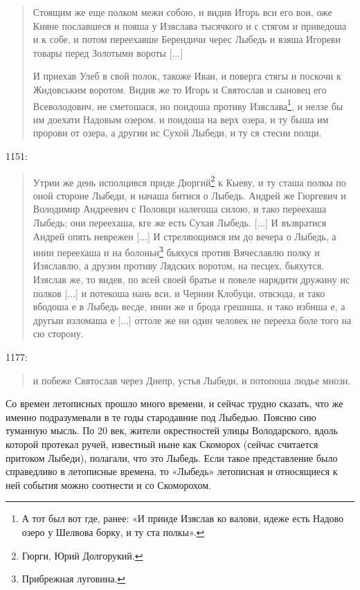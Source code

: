 \begin{quotation}
\noindent Стоящим же еще полком межи собою, и видив Игорь вси его вои, оже Кияне пославшеся и пояша у Изяслава тысячкого и с стягом и приведоша и к собе, и потом переехавше Берендичи черес Лыбедь и взяша Игореви товары перед Золотыми вороты [...]

И приехав Улеб в свой полок, такоже Иван, и поверга стягы и поскочи к Жидовським воротом. Видив же то Игорь и Святослав и сыновец его Всеволодович, не сметошася, но поидоша противу Изяслава\footnote{А тот был вот где, ранее: «И прииде Изяслав ко валови, идеже есть Надово озеро у Шелвова борку, и ту ста полкы».}, и нелзе бы им доехати Надовым озером, и поидоша на верх озера, и ту быша им пророви от озера, а другии ис Сухой Лыбеди, и ту ся стесни полци.
\end{quotation} 

1151:

\begin{quotation}
\noindent Утрии же день исполцився приде Дюргий\footnote{Гюрги, Юрий Долгорукий.} к Кыеву, и ту сташа полкы по оной стороне Лыбеди, и начаша битися о Лыбедь. Андрей же Гюргевич и Володимир Андреевич с Половци налегоша силою, и тако переехаша Лыбедь; они переехаша, кге же есть Сухая Лыбедь. [...]
И възвратися Андрей опять неврежен [...] И стреляющимся им до вечера о Лыбедь, а инии переехаша и на болоньи\footnote{Прибрежная луговина.} бьяхуся против Вячеславлю полку и Изяславлю, а друзии противу Лядских воротом, на песцех, бьяхутся. Изяслав же, то видев, по всей своей братье и повеле нарядити дружину ис полков [...] и потекоша нань вси, и Чернии Клобуци, отвсюда, и тако вбодоша е в Лыбедь весде, инии же и брода грешиша, и тако избиша е, а другыи изломаша е [...] оттоле же ни один человек не перееха боле того на сю сторону.
\end{quotation}

1177:

\begin{quotation}
\noindent и побеже Святослав через Днепр, устья Лыбеди, и потопоша людье мнози.
\end{quotation}

Со времен летописных прошло много времени, и сейчас трудно сказать, что же именно подразумевали в те годы стародавние под Лыбедью. Поясню сию туманную мысль. По 20 век, жители окрестностей улицы Володарского, вдоль которой протекал ручей, известный ныне как Скоморох (сейчас считается притоком Лыбеди), полагали, что это Лыбедь. Если такое представление было справедливо в летописные времена, то «Лыбедь» летописная и относящиеся к ней события можно соотнести и со Скоморохом.

